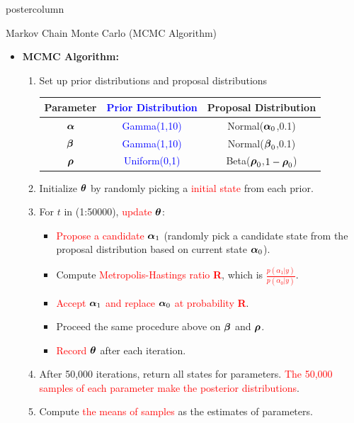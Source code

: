 \documentclass[final]{beamer}\usepackage[]{graphicx}\usepackage[]{color}
\newcommand{\balpha}{\mbox{\boldmath $\alpha$} }
\newcommand{\bbeta}{\mbox{\boldmath $\beta$} }
\newcommand{\brho}{\mbox{\boldmath $\rho$} }
\newcommand{\btheta}{\mbox{\boldmath $\theta$} }
\newcommand{\red}{\textcolor{red}}
\newcommand{\blue}{\textcolor{blue}}
\begin{document}
{\begin{frame}
\begin{columns}
\begin{column}{.33\textwidth}
\begin{beamercolorbox}[center,wd=\textwidth]{postercolumn}
\begin{minipage}[T]{.97\textwidth}
{\begin{block}{Markov Chain Monte Carlo (MCMC Algorithm)}
\begin{itemize}
		
		
		\item \textbf{MCMC Algorithm:}
		  \begin{enumerate}
	
    		\item Set up prior distributions and proposal distributions
    		\vspace{0.1cm}
    		  \renewcommand\arraystretch{1.3}
          \begin{center}
          \begin{tabular}{c|cc}
          \textbf{Parameter}  & \blue{\textbf{Prior Distribution}} & \textbf{Proposal Distribution}\\ \hline
          \large{$\balpha$}    & \blue{Gamma(1,10)}   & Normal($\balpha_0$,0.1)  \\ %
          \large{$\bbeta$}     & \blue{Gamma(1,10)}   & Normal($\bbeta_0$,0.1)  \\ %
          \large{$\brho$}      & \blue{Uniform(0,1)}  & Beta($\brho_0$,$1-\brho_0$)   \\ %
          \end{tabular}  
         \end{center}
          
      \vspace{0.3cm}  
    		\item Initialize $\btheta$  by randomly picking a \red{initial state} from each prior.
    		 
    		\item For $t$ in (1:50000), \red{update $\btheta$}:
    		 \begin{itemize}
	       \item \red{Propose a candidate $\balpha_1$} (randomly pick a candidate state from the proposal distribution based on current state $\balpha_0$).
	        \item Compute \red{Metropolis-Hastings ratio \textbf{R}}, which is \red{$\frac{p(\alpha_1|y)}{p(\alpha_0|y)}$}.
	        \item \red{Accept $\balpha_1$ and replace $\balpha_0$ at probability \textbf{R}}.
	        \item Proceed the same procedure above on $\bbeta$ and $\brho$.
	        \item \red{Record $\btheta$} after each iteration.
	       \end{itemize}
	       
	       \item After 50,000 iterations, return all states for parameters. \red{The 50,000 samples of each parameter make the posterior distributions}.
	       \item Compute \red{the means of samples} as the estimates of parameters.
	       \end{enumerate}
	      

\end{itemize}
\end{block}}
\end{minipage}
\end{beamercolorbox}
\end{column}
\end{columns}
\end{frame}}
\end{document}
